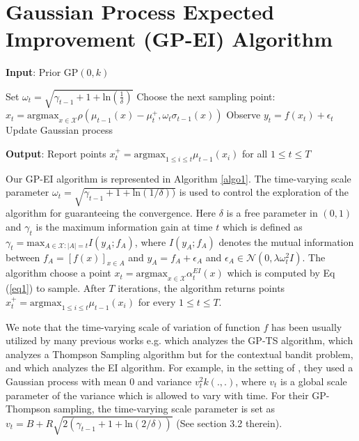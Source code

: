 \documentclass[twoside]{article}
\begin{document}
\section{Gaussian Process Expected Improvement (GP-EI) Algorithm}
\begin{algorithm}[tb]
\caption{GP-EI Algorithm}
\label{algo1}
\textbf{Input}: Prior $\text{GP}(0, k)$
\begin{algorithmic}[1]
    \STATE Set $\omega_t = \sqrt{\gamma_{t-1} + 1 + \text{ln}(\frac{1}{\delta})}$
    \STATE Choose the next sampling point: $x_t = \text{argmax}_{x \in \mathcal X} \rho(\mu_{t-1}(x) - \mu_{t}^+, \omega_t \sigma_{t-1}(x))$
    \STATE Observe $y_t = f(x_t) + \epsilon_t$
    \STATE Update Gaussian process
\ENDFOR
\end{algorithmic}
\textbf{Output}: Report points $x^+_t = \text{argmax}_{1\le i \le t} \mu_{t-1}(x_i)$ for all $1 \le t \le T$
\end{algorithm}
Our GP-EI algorithm is represented in Algorithm \ref{algo1}. The time-varying scale parameter $\omega_t = \sqrt{\gamma_{t-1} + 1 + \text{ln}(1/\delta))}$ is used to control the exploration of the algorithm for guaranteeing the convergence. Here $\delta$ is a free parameter in $(0,1)$ and $\gamma_{t}$ is the maximum information gain at time $t$ which is defined as $\gamma_t = \text{max}_{A \in \mathcal X: |A| = t} I(y_A;f_A)$, where $I(y_A;f_A)$ denotes the mutual information between $f_A = [f(x)]_{x \in A}$ and $y_A = f_A + \epsilon_A$ and $\epsilon_A \in \mathcal N(0, \lambda\omega^2_tI)$. The algorithm choose a point $x_t = \text{argmax}_{x \in \mathcal X} \alpha_t^{EI}(x)$ which is computed by Eq (\ref{eq1}) to sample. After $T$ iterations, the algorithm returns points $x^+_t = \text{argmax}_{1\le i \le t} \mu_{t-1}(x_i)$ for every $1 \le t \le T$.

We note that the time-varying scale of variation of function $f$ has been usually utilized by many previous works e.g. \citep{Chowdhury17} which analyzes the GP-TS algorithm, \citep{agrawal13} which analyzes a Thompson Sampling algorithm but for the contextual bandit problem, and \citep{wang2014} which analyzes the EI algorithm. For example, in the setting of \citep{Chowdhury17}, they used a Gaussian process with mean 0 and variance $v^2_tk(.,.)$, where $v_t$ is a global scale parameter of the variance which is allowed to vary with time. For their GP-Thompson sampling, the time-varying scale parameter is set as $v_t = B + R \sqrt{2(\gamma_{t-1} + 1 + \text{ln}(2/\delta))}$ (See section 3.2 therein).
\end{document}
